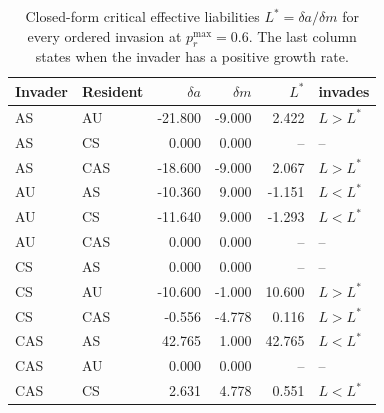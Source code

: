 \begin{table}[htbp]
\centering
\caption{Closed-form critical effective liabilities $L^{*}=\delta a/\delta m$ for every ordered invasion at $p_r^{\max}=0.6$. The last column states when the invader has a positive growth rate.}
\label{tab:thresholds}
\begin{tabular}{llrrrl}
\toprule
Invader & Resident & $\delta a$ & $\delta m$ & $L^{*}$ & invades \\
\midrule
AS & AU & -21.800 & -9.000 & 2.422 & $L>L^*$ \\
AS & CS & 0.000 & 0.000 & -- & -- \\
AS & CAS & -18.600 & -9.000 & 2.067 & $L>L^*$ \\
AU & AS & -10.360 & 9.000 & -1.151 & $L<L^*$ \\
AU & CS & -11.640 & 9.000 & -1.293 & $L<L^*$ \\
AU & CAS & 0.000 & 0.000 & -- & -- \\
CS & AS & 0.000 & 0.000 & -- & -- \\
CS & AU & -10.600 & -1.000 & 10.600 & $L>L^*$ \\
CS & CAS & -0.556 & -4.778 & 0.116 & $L>L^*$ \\
CAS & AS & 42.765 & 1.000 & 42.765 & $L<L^*$ \\
CAS & AU & 0.000 & 0.000 & -- & -- \\
CAS & CS & 2.631 & 4.778 & 0.551 & $L<L^*$ \\
\bottomrule
\end{tabular}
\end{table}
